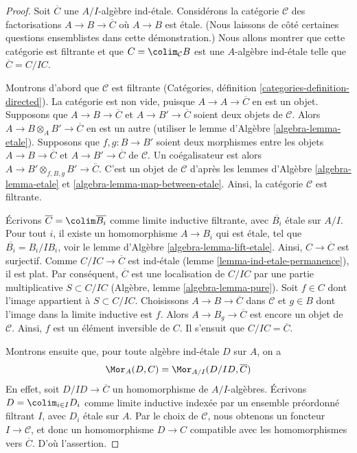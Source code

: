 \begin{proof}
Soit $\overline{C}$ une $A/I$-algèbre ind-\'etale.
Considérons la catégorie $\mathcal{C}$ des factorisations
$A \to B \to \overline{C}$ où $A \to B$ est \'etale.
(Nous laissons de côté certaines questions ensemblistes dans cette démonstration.)
Nous allons montrer que cette catégorie est filtrante et que
$C = \colim_\mathcal{C} B$ est une $A$-algèbre ind-\'etale
telle que $\overline{C} = C/IC$.

\medskip\noindent
Montrons d'abord que $\mathcal{C}$ est filtrante
(Catégories, définition \ref{categories-definition-directed}).
La catégorie est non vide, puisque $A \to A \to \overline{C}$ en est un objet.
Supposons que $A \to B \to \overline{C}$ et $A \to B' \to \overline{C}$
soient deux objets de $\mathcal{C}$. Alors $A \to B \otimes_A B' \to \overline{C}$
en est un autre (utiliser le lemme d'Algèbre \ref{algebra-lemma-etale}).
Supposons que $f, g : B \to B'$ soient deux morphismes entre les
objets $A \to B \to \overline{C}$ et $A \to B' \to \overline{C}$
de $\mathcal{C}$. Un coégalisateur est alors
$A \to B' \otimes_{f, B, g} B' \to \overline{C}$.
C'est un objet de $\mathcal{C}$ d'après les
lemmes d'Algèbre \ref{algebra-lemma-etale} et
\ref{algebra-lemma-map-between-etale}.
Ainsi, la catégorie $\mathcal{C}$ est filtrante.

\medskip\noindent
Écrivons $\overline{C} = \colim \overline{B_i}$ comme limite inductive filtrante, avec
$\overline{B_i}$ \'etale sur $A/I$. Pour tout $i$,
il existe un homomorphisme $A \to B_i$ qui est \'etale, tel que $\overline{B_i} = B_i/IB_i$, voir le
lemme d'Algèbre \ref{algebra-lemma-lift-etale}.
Ainsi, $C \to \overline{C}$ est surjectif.
Comme $C/IC \to \overline{C}$ est ind-\'etale
(lemme \ref{lemma-ind-etale-permanence}),
il est plat. Par conséquent, $\overline{C}$ est une localisation de
$C/IC$ par une partie multiplicative $S \subset C/IC$
(Algèbre, lemme \ref{algebra-lemma-pure}).
Soit $f \in C$ dont l'image appartient à $S \subset C/IC$.
Choisissons $A \to B \to \overline{C}$ dans $\mathcal{C}$ et $g \in B$
dont l'image dans la limite inductive est $f$. Alors $A \to B_g \to \overline{C}$
est encore un objet de $\mathcal{C}$. Ainsi, $f$ est un élément inversible
de $C$. Il s'ensuit que $C/IC = \overline{C}$.

\medskip\noindent
Montrons ensuite que, pour toute algèbre ind-\'etale $D$ sur $A$, on a
$$
\Mor_A(D, C) = \Mor_{A/I}(D/ID, \overline{C})
$$
En effet, soit $D/ID \to \overline{C}$ un homomorphisme de $A/I$-algèbres.
Écrivons $D = \colim_{i \in I} D_i$ comme limite inductive indexée par un ensemble préordonné filtrant $I$,
avec $D_i$ \'etale sur $A$. Par le choix de $\mathcal{C}$,
nous obtenons un foncteur $I \to \mathcal{C}$, et donc un homomorphisme
$D \to C$ compatible avec les homomorphismes vers $\overline{C}$. D'où l'assertion.


\end{proof}
